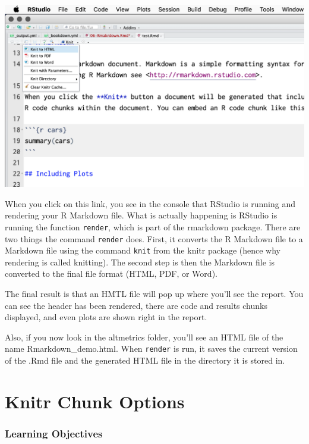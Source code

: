 \documentclass[
]{book}
\begin{document}
\includegraphics{img/kh.png}

When you click on this link, you see in the console that RStudio is running and rendering your R Markdown file. What is actually happening is RStudio is running the function \texttt{render}, which is part of the rmarkdown package. There are two things the command \texttt{render} does. First, it converts the R Markdown file to a Markdown file using the command \texttt{knit} from the knitr package (hence why rendering is called knitting). The second step is then the Markdown file is converted to the final file format (HTML, PDF, or Word).

The final result is that an HMTL file will pop up where you'll see the report. You can see the header has been rendered, there are code and results chunks displayed, and even plots are shown right in the report.

Also, if you now look in the altmetrics folder, you'll see an HTML file of the name Rmarkdown\_demo.html. When \texttt{render} is run, it saves the current version of the .Rmd file and the generated HTML file in the directory it is stored in.

\hypertarget{knitr-chunk-options}{%
\section{Knitr Chunk Options}\label{knitr-chunk-options}}

\hypertarget{learning-objectives-4}{%
\subsubsection*{Learning Objectives}\label{learning-objectives-4}}
\end{document}
